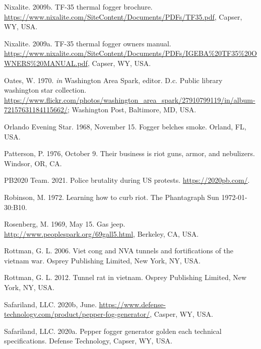 \documentclass[
  11pt,
]{krantz}
\newlength{\cslhangindent}
\newlength{\cslentryspacingunit} %
\newenvironment{CSLReferences}[2] %
 {%
  \setlength{\parindent}{0pt}
  \ifodd #1
  \let\oldpar\par
  \def\par{\hangindent=\cslhangindent\oldpar}
  \fi
  \setlength{\parskip}{#2\cslentryspacingunit}
 }%
 {}
\begin{document}
\begin{CSLReferences}{1}{0}
\leavevmode{}%
Nixalite. 2009b. TF-35 thermal fogger brochure. \url{https://www.nixalite.com/SiteContent/Documents/PDFs/TF35.pdf}, Capser, WY, USA.

\leavevmode{}%
Nixalite. 2009a. TF-35 thermal fogger owners manual. \url{https://www.nixalite.com/SiteContent/Documents/PDFs/IGEBA\%20TF35\%20OWNERS\%20MANUAL.pdf}, Capser, WY, USA.

\leavevmode{}%
Oates, W. 1970. \emph{in} Washington Area Spark, editor. D.c. Public library washington star collection. \url{https://www.flickr.com/photos/washington_area_spark/27910799119/in/album-72157631184115662/}; Washington Post, Baltimore, MD, USA.

\leavevmode{}%
Orlando Evening Star. 1968, November 15. Fogger belches smoke. Orland, FL, USA.

\leavevmode{}%
Patterson, P. 1976, October 9. Their business is riot guns, armor, and nebulizers. Windsor, OR, CA.

\leavevmode{}%
PB2020 Team. 2021. Police brutality during US protests. \url{https://2020pb.com/}.

\leavevmode{}%
Robinson, M. 1972. Learning how to curb riot. The Phantagraph Sun 1972-01-30:B10.

\leavevmode{}%
Rosenberg, M. 1969, May 15. Gas jeep. \url{http://www.peoplespark.org/69gall5.html}, Berkeley, CA, USA.

\leavevmode{}%
Rottman, G. L. 2006. Viet cong and NVA tunnels and fortifications of the vietnam war. Osprey Publishing Limited, New York, NY, USA.

\leavevmode{}%
Rottman, G. L. 2012. Tunnel rat in vietnam. Osprey Publishing Limited, New York, NY, USA.

\leavevmode{}%
Safariland, LLC. 2020b, June. \url{https://www.defense-technology.com/product/pepper-fog-generator/}, Casper, WY, USA.

\leavevmode{}%
Safariland, LLC. 2020a. Pepper fogger generator golden each technical specifications. Defense Technology, Capser, WY, USA.


\end{CSLReferences}
\end{document}
